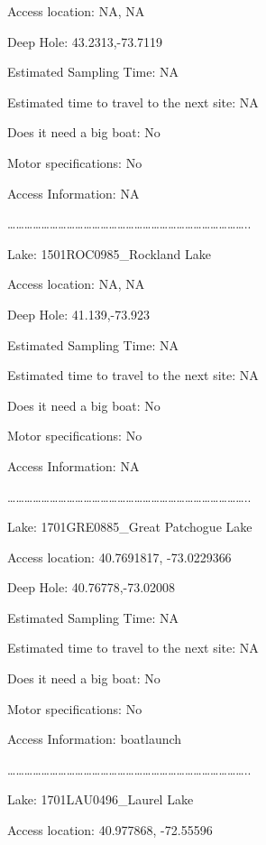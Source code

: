 \documentclass[]{article}
\begin{document}
Access location: NA, NA

Deep Hole: 43.2313,-73.7119

Estimated Sampling Time: NA

Estimated time to travel to the next site: NA

Does it need a big boat: No

Motor specifications: No

Access Information: NA

\ldots{}\ldots{}\ldots{}\ldots{}\ldots{}\ldots{}\ldots{}\ldots{}\ldots{}\ldots{}\ldots{}\ldots{}\ldots{}\ldots{}\ldots{}\ldots{}\ldots{}\ldots{}\ldots{}\ldots{}\ldots{}\ldots{}\ldots{}\ldots{}\ldots{}\ldots{}\ldots{}\ldots{}..

Lake: 1501ROC0985\_Rockland Lake

Access location: NA, NA

Deep Hole: 41.139,-73.923

Estimated Sampling Time: NA

Estimated time to travel to the next site: NA

Does it need a big boat: No

Motor specifications: No

Access Information: NA

\ldots{}\ldots{}\ldots{}\ldots{}\ldots{}\ldots{}\ldots{}\ldots{}\ldots{}\ldots{}\ldots{}\ldots{}\ldots{}\ldots{}\ldots{}\ldots{}\ldots{}\ldots{}\ldots{}\ldots{}\ldots{}\ldots{}\ldots{}\ldots{}\ldots{}\ldots{}\ldots{}\ldots{}..

Lake: 1701GRE0885\_Great Patchogue Lake

Access location: 40.7691817, -73.0229366

Deep Hole: 40.76778,-73.02008

Estimated Sampling Time: NA

Estimated time to travel to the next site: NA

Does it need a big boat: No

Motor specifications: No

Access Information: boatlaunch

\ldots{}\ldots{}\ldots{}\ldots{}\ldots{}\ldots{}\ldots{}\ldots{}\ldots{}\ldots{}\ldots{}\ldots{}\ldots{}\ldots{}\ldots{}\ldots{}\ldots{}\ldots{}\ldots{}\ldots{}\ldots{}\ldots{}\ldots{}\ldots{}\ldots{}\ldots{}\ldots{}\ldots{}..

Lake: 1701LAU0496\_Laurel Lake

Access location: 40.977868, -72.55596
\end{document}

